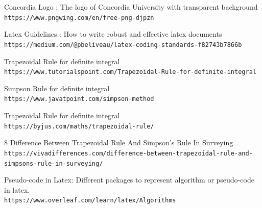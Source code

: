 \documentclass[letterpaper, 11pt]{article}
\begin{document}
\begin{thebibliography}{}      
Concordia Logo : The logo of Concordia University with transparent background
\\\texttt{https://www.pngwing.com/en/free-png-djpzn}

Latex Guidelines : How to write robust and effective latex documents
\\\texttt{https://medium.com/@pbeliveau/latex-coding-standards-f82743b7866b}

Trapezoidal Rule for definite integral
\\\texttt{https://www.tutorialspoint.com/Trapezoidal-Rule-for-definite-integral}

Simpson Rule for definite integral
\\\texttt{https://www.javatpoint.com/simpson-method}

Trapezoidal Rule for definite integral
\\\texttt{https://byjus.com/maths/trapezoidal-rule/}

8 Difference Between Trapezoidal Rule And Simpson’s Rule In Surveying 
\\\texttt{https://vivadifferences.com/difference-between-trapezoidal-rule-and-simpsons-rule-in-surveying/}


Pseudo-code in Latex: Different packages to represent algorithm or pseudo-code in latex.
\\\texttt{https://www.overleaf.com/learn/latex/Algorithms}

\end{thebibliography}  
\end{document}

